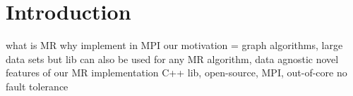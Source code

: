 \section{Introduction}

  what is MR
  why implement in MPI
  our motivation = graph algorithms, large data sets
    but lib can also be used for any MR algorithm, data agnostic
  novel features of our MR implementation
    C++ lib, open-source, MPI, out-of-core
    no fault tolerance

